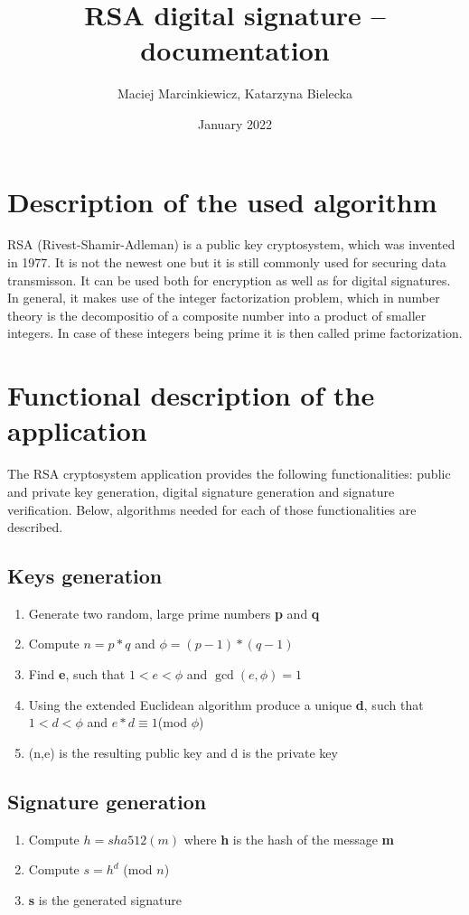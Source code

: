 \documentclass{article}
\title{ RSA digital signature -- documentation}
\author{Maciej Marcinkiewicz, Katarzyna Bielecka}
\date{\nth{20} January 2022}
\begin{document}
\maketitle

\section{Description of the used algorithm}
RSA (Rivest-Shamir-Adleman) is a public key cryptosystem, which was invented in 1977. It is not the newest one but it is still commonly used for securing data transmisson.
It can be used both for encryption as well as for digital signatures. In general, it makes use of the integer factorization problem, which in number theory is the decompositio of a composite number into a product of smaller integers. In case of these integers being prime it is then called prime factorization.  

\section{Functional description of the application}
The RSA cryptosystem application provides the following functionalities:
public and private key generation, digital signature generation and signature verification.
Below, algorithms needed for each of those functionalities are described.

\subsection{Keys generation}
\begin{enumerate}
    \item Generate two random, large prime numbers \textbf{p} and \textbf{q}
    \item Compute $ n = p*q $  and $ \phi = (p - 1)*(q - 1) $
    \item Find \textbf{e}, such that  $ 1 < e < \phi$ and $\gcd(e,\phi) = 1 $
    \item Using the extended Euclidean algorithm produce a unique \textbf{d}, such that $ 1 < d < \phi $  and $ e*d \equiv  1 $(mod $\phi$)  
    \item (n,e) is the resulting public key and d is the private key
\end{enumerate}

\subsection{Signature generation}
\begin{enumerate}
    \item Compute $  h = sha512(m) $ where \textbf{h} is the hash of the message \textbf{m}  
    \item Compute $ s = h^d $ (mod $n$)
    \item \textbf{s} is the generated signature
\end{enumerate}
\end{document}
